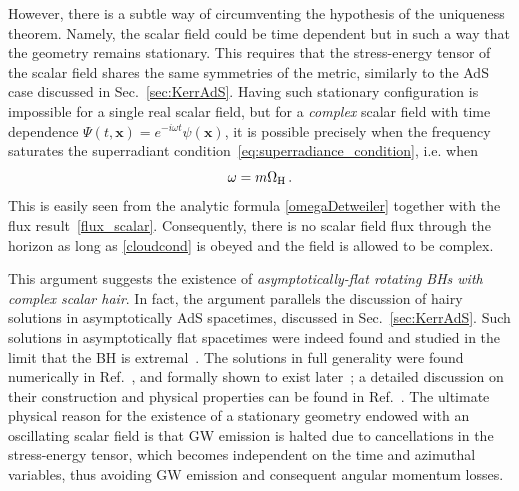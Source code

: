 \documentclass[11pt]{article}
\numberwithin{equation}{section} %
\begin{document}
However, there is a subtle way of circumventing the hypothesis of the uniqueness theorem. Namely, the scalar field could 
be time dependent but in such a way that the geometry remains stationary. This requires that the stress-energy tensor of 
the scalar field shares the same symmetries of the metric, similarly to the AdS case discussed in 
Sec.~\ref{sec:KerrAdS}. Having such stationary configuration is impossible for a single real scalar field, but for a 
\textit{complex} scalar field with time dependence $\Psi(t,\mathbf{x})=e^{-i\omega t}\psi(\mathbf{x})$, it is possible 
precisely when
the frequency saturates the superradiant condition~\eqref{eq:superradiance_condition}, i.e. when
%
\begin{equation}
 \omega=m\Omega_{\rm H} \,. \label{cloudcond}
\end{equation}
%
This is easily seen from the analytic formula \eqref{omegaDetweiler} together with the flux
result~\eqref{flux_scalar}. Consequently, there is no scalar field flux through the horizon as long as
\eqref{cloudcond} is obeyed and the field is allowed to be complex.





This argument suggests the existence of \textit{asymptotically-flat rotating BHs with complex scalar hair}.
In fact, the argument parallels the discussion of hairy solutions in asymptotically AdS spacetimes, discussed in 
Sec.~\ref{sec:KerrAdS}. Such solutions in asymptotically flat spacetimes were indeed found
and studied in the limit that the BH is extremal~\cite{Hod:2012px,Hod:2013zza}.
The solutions in full generality were found numerically in Ref.~\cite{Herdeiro:2014goa}, and formally shown to exist later~\cite{Chodosh:2015oma}; a detailed discussion on their 
construction and physical properties can be found in Ref.~\cite{Herdeiro:2015gia}.
The ultimate physical reason for the existence of a stationary geometry endowed with an oscillating scalar field is that 
GW emission is halted due to cancellations in the stress-energy tensor, which
becomes independent on the time and azimuthal variables, thus avoiding
GW emission and consequent angular momentum losses.
\end{document}
